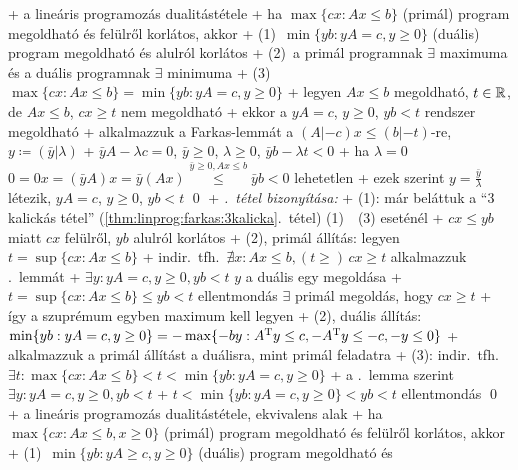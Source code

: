 
+ \thm \label{thm:linprog:dual:dual}a lineáris programozás dualitástétele
  + ha $\max \{ cx : Ax \le b \}$ (primál) program megoldható és
    felülről korlátos, akkor
    + (1)~$\min \{ yb : yA = c, y \ge 0 \}$ (duális) program megoldható és
      alulról korlátos
    + (2)~a primál programnak $\exists$ maximuma és a duális programnak
      $\exists$ minimuma
    + (3)~$\max \{ cx : Ax \le b \} = \min \{ yb : yA = c, y \ge 0 \}$
+ \lemma \label{lem:linprog:dual:t}legyen $A x \le b$ megoldható, $t
  \in \mathbb{R}$, de $A x \le b$, $cx \ge t$ nem megoldható
  + ekkor a $yA = c$, $y \ge 0$, $yb < t$ rendszer megoldható
  + \proof alkalmazzuk a Farkas-lemmát a $(A|-c) x \le (b|-t)$-re, $y
    \coloneqq (\bar{y}|\lambda)$
    + $\bar{y} A - \lambda c = 0$, $\bar{y} \ge 0$, $\lambda \ge 0$,
      $\bar{y} b - \lambda t < 0$
    + ha $\lambda = 0$ \RA $0 = 0 x = (\bar{y} A) x = \bar{y} (Ax)
      \overset{\bar{y} \ge 0, Ax \le b}{\le} \bar{y} b < 0$ \RA%
      lehetetlen
    + ezek szerint $y = \frac{\bar{y}}{\lambda}$ létezik, $y A = c$,
      $y \ge 0$, $yb < t$ \qed
+ \emph{.~tétel bizonyítása:}
  + (1): már beláttuk a ``3 kalickás tétel''
  (\ref{thm:linprog:farkas:3kalicka}.~tétel) (1)~\LRA~(3) eseténél
    + $cx \le yb$ miatt $cx$ felülről, $yb$ alulról korlátos
  + (2), primál állítás: legyen $t = \sup \{ cx : Ax \le b \}$
    + indir.~tfh.~$\nexists x : Ax \le b, (t \ge )\,cx \ge t$ \RA alkalmazzuk
    .~lemmát
    + $\exists y : yA = c, y \ge 0, yb < t$ \RA $y$ a duális egy
      megoldása
    +  $t = \sup \{ cx : Ax \le b \} \le yb < t$ \RA ellentmondás \RA $\exists$ primál
      megoldás, hogy $cx \ge t$
    + így a szuprémum egyben maximum kell legyen
  + (2), duális állítás: $\min \{ yb : yA = c, y \ge 0 \} = - \max \{
    -by : A^{\mathrm{T}} y \le c, -A^{\mathrm{T}} y \le -c, -y \le 0 \}$
    + alkalmazzuk a primál állítást a duálisra, mint primál feladatra
  + (3): indir.~tfh.~$\exists t : \max \{ cx : Ax \le b \} < t < \min
    \{ yb : yA = c, y \ge 0 \}$
    + a .~lemma szerint $\exists y : yA = c,
      y \ge 0, yb < t$
    + $t < \min \{ yb : yA = c, y \ge 0 \} < yb < t$ \RA ellentmondás
    \qed
+ \thm \label{thm:linprog:dual:dual}a lineáris programozás
  dualitástétele, ekvivalens alak
  + ha $\max \{ cx : Ax \le b, x \ge 0 \}$ (primál) program megoldható és
    felülről korlátos, akkor
    + (1)~$\min \{ yb : yA \ge c, y \ge 0 \}$ (duális) program megoldható és
